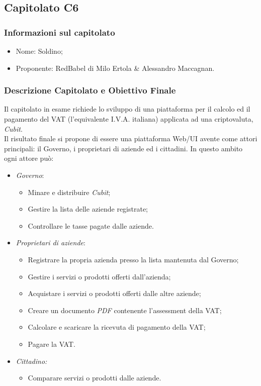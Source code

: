 \subsection{Capitolato C6}\label{C6}

\subsubsection{Informazioni sul capitolato}
\begin{itemize}
  \item{Nome}: Soldino;
  \item{Proponente}: RedBabel di Milo Ertola \& Alessandro Maccagnan.
\end{itemize}
\subsubsection{Descrizione Capitolato e Obiettivo Finale}
Il capitolato in esame richiede lo sviluppo di una piattaforma per il calcolo ed il pagamento del VAT (l'equivalente I.V.A. italiana) applicata ad una criptovaluta, \textit{Cubit}\glossario. \\
Il risultato finale si propone di essere una piattaforma Web/UI avente come attori principali: il Governo, i proprietari di aziende ed i cittadini. In questo ambito ogni attore può:
\begin{itemize}
  \item \textit{Governo}:
  \begin{itemize}
    \item Minare e distribuire \textit{Cubit};
    \item Gestire la lista delle aziende registrate;
    \item Controllare le tasse pagate dalle aziende.
  \end{itemize}
  \item \textit{Proprietari di aziende}:
  \begin{itemize}
    \item Registrare la propria azienda presso la lista mantenuta dal Governo;
    \item Gestire i servizi o prodotti offerti dall'azienda;
    \item Acquistare i servizi o prodotti offerti dalle altre aziende;
    \item Creare un documento \textit{PDF} contenente l'assessment della VAT;
    \item Calcolare e scaricare la ricevuta di pagamento della VAT;
    \item Pagare la VAT.
  \end{itemize}
  \item \textit{Cittadino:}
  \begin{itemize}
    \item Comparare servizi o prodotti dalle aziende.
  \end{itemize}
\end{itemize}

